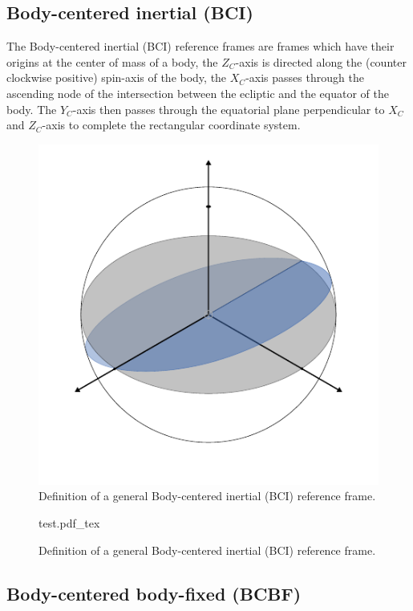 \subsection{Body-centered inertial (BCI)}

The Body-centered inertial (BCI) reference frames are frames which have their
origins at the center of mass of a body, the $Z_C$-axis is directed along the
(counter clockwise positive) spin-axis of the body, the $X_C$-axis passes
through the ascending node of the intersection between the ecliptic and the
equator of the body. The $Y_C$-axis then passes through the equatorial plane
perpendicular to $X_C$ and $Z_C$-axis to complete the rectangular coordinate
system.

\begin{figure}[!htp]
    \centering
    \includegraphics[width=0.4\linewidth]{graphics/test.pdf}
    \caption{Definition of a general Body-centered inertial (BCI) reference frame.}
    \label{fig:bci}
\end{figure}

\begin{figure}[h]
    \centering
    \def\svgwidth{0.4\linewidth}
    {test.pdf_tex}
    \caption{Definition of a general Body-centered inertial (BCI) reference frame.}
    \label{fig:my_label}
\end{figure}

\subsection{Body-centered body-fixed (BCBF)\label{ssec:frame_bcbf}}

